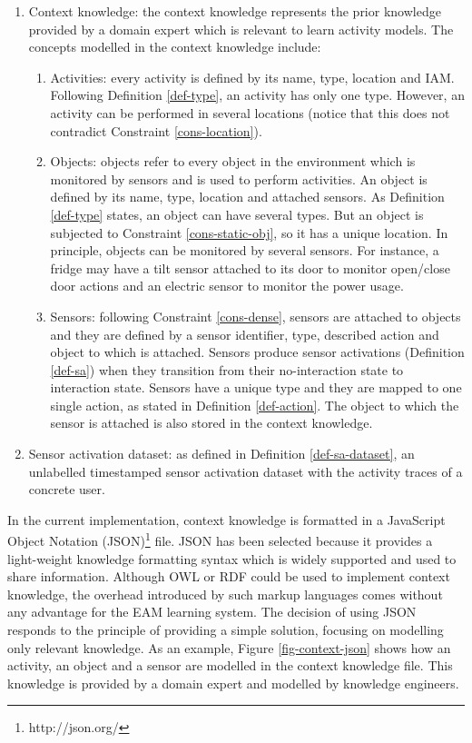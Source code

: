 \begin{enumerate}
 \item Context knowledge: the context knowledge represents the prior knowledge provided by a domain expert which is relevant to learn activity models. The concepts modelled in the context knowledge include: 
 \begin{enumerate}
  \item Activities: every activity is defined by its name, type, location and IAM. Following Definition \ref{def-type}, an activity has only one type. However, an activity can be performed in several locations (notice that this does not contradict Constraint \ref{cons-location}). 
  \item Objects: objects refer to every object in the environment which is monitored by sensors and is used to perform activities. An object is defined by its name, type, location and attached sensors. As Definition \ref{def-type} states, an object can have several types. But an object is subjected to Constraint \ref{cons-static-obj}, so it has a unique location. In principle, objects can be monitored by several sensors. For instance, a fridge may have a tilt sensor attached to its door to monitor open/close door actions and an electric sensor to monitor the power usage.
  \item Sensors: following Constraint \ref{cons-dense}, sensors are attached to objects and they are defined by a sensor identifier, type, described action and object to which is attached. Sensors produce sensor activations (Definition \ref{def-sa}) when they transition from their no-interaction state to interaction state. Sensors have a unique type and they are mapped to one single action, as stated in Definition \ref{def-action}. The object to which the sensor is attached is also stored in the context knowledge.
 \end{enumerate}
 
 \item Sensor activation dataset: as defined in Definition \ref{def-sa-dataset}, an unlabelled timestamped sensor activation dataset with the activity traces of a concrete user.
\end{enumerate}

In the current implementation, context knowledge is formatted in a JavaScript Object Notation (JSON)\footnote{http://json.org/} file. JSON has been selected because it provides a light-weight knowledge formatting syntax which is widely supported and used to share information. Although OWL or RDF could be used to implement context knowledge, the overhead introduced by such markup languages comes without any advantage for the EAM learning system. The decision of using JSON responds to the principle of providing a simple solution, focusing on modelling only relevant knowledge. As an example, Figure \ref{fig-context-json} shows how an activity, an object and a sensor are modelled in the context knowledge file. This knowledge is provided by a domain expert and modelled by knowledge engineers. 


